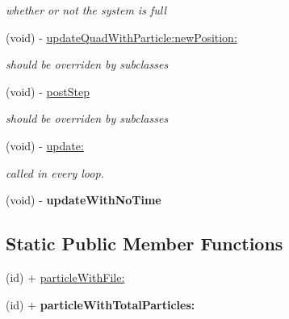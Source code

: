 \begin{DoxyCompactItemize}
\begin{DoxyCompactList}\small\item\em whether or not the system is full \end{DoxyCompactList}\item 
\hypertarget{interface_c_c_particle_system_ab2d38029ba020a66c29cc9fa8cf1d590}{(void) -\/ \hyperlink{interface_c_c_particle_system_ab2d38029ba020a66c29cc9fa8cf1d590}{update\-Quad\-With\-Particle\-:new\-Position\-:}}\label{interface_c_c_particle_system_ab2d38029ba020a66c29cc9fa8cf1d590}

\begin{DoxyCompactList}\small\item\em should be overriden by subclasses \end{DoxyCompactList}\item 
\hypertarget{interface_c_c_particle_system_a2fc5c1d696ee6a84f56670a053836322}{(void) -\/ \hyperlink{interface_c_c_particle_system_a2fc5c1d696ee6a84f56670a053836322}{post\-Step}}\label{interface_c_c_particle_system_a2fc5c1d696ee6a84f56670a053836322}

\begin{DoxyCompactList}\small\item\em should be overriden by subclasses \end{DoxyCompactList}\item 
\hypertarget{interface_c_c_particle_system_aaf683c943f80865328ed7bec8906c978}{(void) -\/ \hyperlink{interface_c_c_particle_system_aaf683c943f80865328ed7bec8906c978}{update\-:}}\label{interface_c_c_particle_system_aaf683c943f80865328ed7bec8906c978}

\begin{DoxyCompactList}\small\item\em called in every loop. \end{DoxyCompactList}\item 
\hypertarget{interface_c_c_particle_system_a908d0912a837832fd7a27e0ab6fb8545}{(void) -\/ {\bfseries update\-With\-No\-Time}}\label{interface_c_c_particle_system_a908d0912a837832fd7a27e0ab6fb8545}

\end{DoxyCompactItemize}
\subsection*{Static Public Member Functions}
\begin{DoxyCompactItemize}
\item 
(id) + \hyperlink{interface_c_c_particle_system_a9a7fca032b670ea0ab77dfce0f67ec96}{particle\-With\-File\-:}
\item 
\hypertarget{interface_c_c_particle_system_a1c1d53119f02bc5222ffe9930d7e3522}{(id) + {\bfseries particle\-With\-Total\-Particles\-:}}\label{interface_c_c_particle_system_a1c1d53119f02bc5222ffe9930d7e3522}

\end{DoxyCompactItemize}
